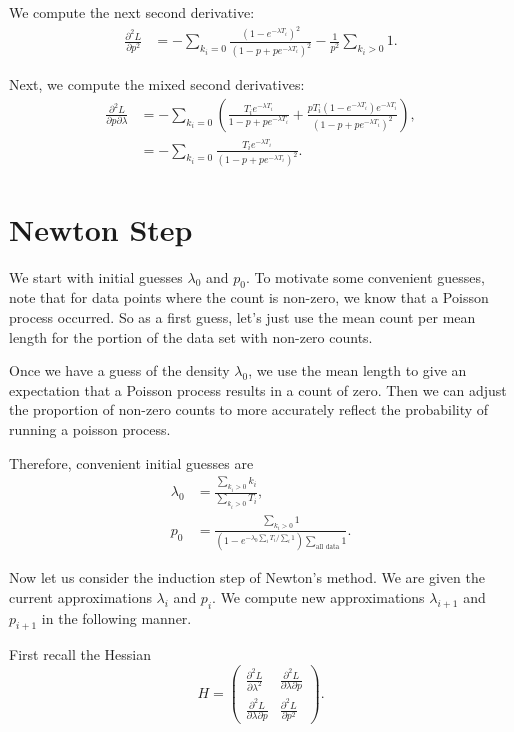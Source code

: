 \documentclass{article}
\newcommand{\pRun}{p}
\newcommand{\expTermi}{e^{- \lambda T_i}}
\newcommand{\commonDenom}{1 - \pRun + \pRun \expTermi}
\begin{document}
We compute the next second derivative:
\begin{align}
\frac{\partial^2 L} {\partial \pRun^2} & = - \sum\limits_{k_i = 0} \frac{\left(1 - \expTermi\right)^2}{\left(\commonDenom\right)^2} - \frac{1}{\pRun^2} \sum\limits_{k_i > 0} 1. 
\end{align}

Next, we compute the mixed second derivatives:
\begin{align}
\frac{\partial^2 L} {\partial \pRun \partial \lambda} & = - \sum\limits_{k_i = 0} \left( \frac{T_i \expTermi}{\commonDenom} 
    + \frac{\pRun T_i \left(1 - \expTermi\right) \expTermi}{\left(\commonDenom\right)^2}\right), \\
& = - \sum\limits_{k_i = 0} \frac{T_i \expTermi}{\left(\commonDenom\right)^2}.   
\end{align}

\section{Newton Step}

We start with initial guesses \(\lambda_0\) and \(\pRun_0\). To motivate some convenient guesses, note that for data points where the count is non-zero, we know that a Poisson process occurred. So as a first guess, let's just use the mean count per mean length for the portion of the data set with non-zero counts. 

Once we have a guess of the density \(\lambda_0\), we use the mean length to give an expectation that a Poisson process results in a count of zero. Then we can adjust the proportion of non-zero counts to more accurately reflect the probability of running a poisson process.

Therefore, convenient initial guesses are
\begin{align}
\lambda_0 & = \frac{\sum_{k_i > 0} k_i}{\sum_{k_i > 0} T_i}, \\
\pRun_0 & = \frac{\sum_{k_i > 0} 1}{\left(1 - e^{-\lambda_0 \sum_i T_i / \sum_i 1}\right)\sum_{\text{all data}} 1}.
\end{align}

Now let us consider the induction step of Newton's method. We are given the current approximations \(\lambda_i\) and \(\pRun_i\). We compute new approximations \(\lambda_{i+1}\) and \(\pRun_{i+1}\) in the following manner.

First recall the Hessian
\begin{equation}
H = 
\begin{pmatrix}
\frac{\partial^2 L}{\partial \lambda^2} & \frac{\partial^2 L}{\partial\lambda \partial \pRun} \\
\frac{\partial^2 L}{\partial \lambda \partial \pRun} & \frac{\partial^2 L}{\partial \pRun^2}
\end{pmatrix}.
\end{equation}
\end{document}
